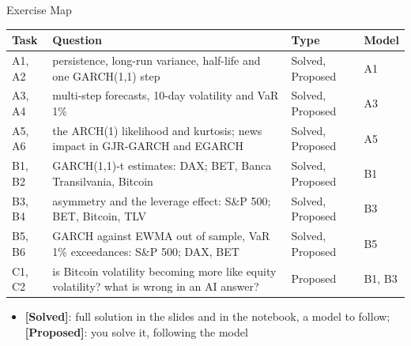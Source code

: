 \begin{frame}{Exercise Map}
\itemsize{\small}
\begin{center}
\footnotesize
\begin{tabular}{>{\raggedright\arraybackslash}p{1.1cm}>{\raggedright\arraybackslash}p{7.5cm}>{\raggedright\arraybackslash}p{1.9cm}>{\raggedright\arraybackslash}p{1.4cm}}
\toprule
\textbf{Task} & \textbf{Question} & \textbf{Type} & \textbf{Model} \\
\midrule
A1, A2 & persistence, long-run variance, half-life and one GARCH(1,1) step & Solved, Proposed & A1 \\
A3, A4 & multi-step forecasts, 10-day volatility and VaR 1\% & Solved, Proposed & A3 \\
A5, A6 & the ARCH(1) likelihood and kurtosis; news impact in GJR-GARCH and EGARCH & Solved, Proposed & A5 \\
B1, B2 & GARCH(1,1)-t estimates: DAX; BET, Banca Transilvania, Bitcoin & Solved, Proposed & B1 \\
B3, B4 & asymmetry and the leverage effect: S\&P 500; BET, Bitcoin, TLV & Solved, Proposed & B3 \\
B5, B6 & GARCH against EWMA out of sample, VaR 1\% exceedances: S\&P 500; DAX, BET & Solved, Proposed & B5 \\
C1, C2 & is Bitcoin volatility becoming more like equity volatility? what is wrong in an AI answer? & Proposed & B1, B3 \\
\bottomrule
\end{tabular}
\end{center}
\begin{itemize}
    \item \textbf{[Solved]}: full solution in the slides and in the notebook, a model to follow; \textbf{[Proposed]}: you solve it, following the model
\end{itemize}
\end{frame}

